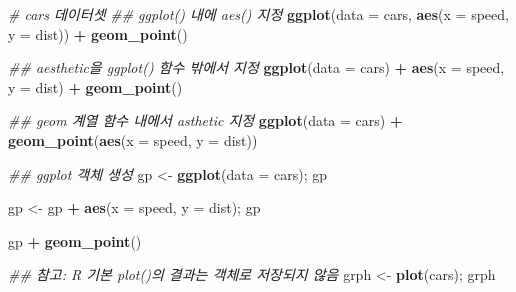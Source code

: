 \documentclass[
  11pt,
]{krantz}
\newenvironment{Shaded}{\begin{snugshade}}{\end{snugshade}}
\newcommand{\CommentTok}[1]{\textcolor[rgb]{0.37,0.37,0.37}{\textit{#1}}}
\newcommand{\DataTypeTok}[1]{\textcolor[rgb]{0.27,0.27,0.27}{#1}}
\newcommand{\KeywordTok}[1]{\textcolor[rgb]{0.27,0.27,0.27}{\textbf{#1}}}
\newcommand{\NormalTok}[1]{#1}
\newcommand{\OperatorTok}[1]{\textcolor[rgb]{0.43,0.43,0.43}{\textbf{#1}}}
\newcommand{\StringTok}[1]{\textcolor[rgb]{0.5,0.5,0.5}{#1}}
\begin{document}
\normalsize

\footnotesize

\begin{Shaded}
\begin{Highlighting}[]
\CommentTok{# cars 데이터셋}
\CommentTok{## ggplot() 내에 aes() 지정 }
\KeywordTok{ggplot}\NormalTok{(}\DataTypeTok{data =}\NormalTok{ cars, }
       \KeywordTok{aes}\NormalTok{(}\DataTypeTok{x =}\NormalTok{ speed, }\DataTypeTok{y =}\NormalTok{ dist)) }\OperatorTok{+}\StringTok{ }
\StringTok{  }\KeywordTok{geom_point}\NormalTok{()}

\CommentTok{## aesthetic을 ggplot() 함수 밖에서 지정}
\KeywordTok{ggplot}\NormalTok{(}\DataTypeTok{data =}\NormalTok{ cars) }\OperatorTok{+}\StringTok{ }
\StringTok{  }\KeywordTok{aes}\NormalTok{(}\DataTypeTok{x =}\NormalTok{ speed, }\DataTypeTok{y =}\NormalTok{ dist) }\OperatorTok{+}\StringTok{ }
\StringTok{  }\KeywordTok{geom_point}\NormalTok{()}

\CommentTok{## geom 계열 함수 내에서 asthetic 지정}
\KeywordTok{ggplot}\NormalTok{(}\DataTypeTok{data =}\NormalTok{ cars) }\OperatorTok{+}\StringTok{ }
\StringTok{  }\KeywordTok{geom_point}\NormalTok{(}\KeywordTok{aes}\NormalTok{(}\DataTypeTok{x =}\NormalTok{ speed, }\DataTypeTok{y =}\NormalTok{ dist))}

\CommentTok{## ggplot 객체 생성 }
\NormalTok{gp <-}\StringTok{ }\KeywordTok{ggplot}\NormalTok{(}\DataTypeTok{data =}\NormalTok{ cars); gp}

\NormalTok{gp <-}\StringTok{ }\NormalTok{gp }\OperatorTok{+}\StringTok{ }
\StringTok{  }\KeywordTok{aes}\NormalTok{(}\DataTypeTok{x =}\NormalTok{ speed, }\DataTypeTok{y =}\NormalTok{ dist); gp}

\NormalTok{gp }\OperatorTok{+}\StringTok{ }\KeywordTok{geom_point}\NormalTok{()}

\CommentTok{## 참고: R 기본 plot()의 결과는 객체로 저장되지 않음}
\NormalTok{grph <-}\StringTok{ }\KeywordTok{plot}\NormalTok{(cars); grph}
\end{Highlighting}
\end{Shaded}

\normalsize
\end{document}
